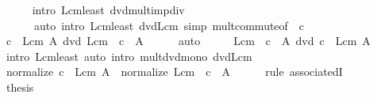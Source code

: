 \begin{isabellebody}
\ \ \ \ \isamarkupfalse%
\ {\isacharparenleft}{\kern0pt}intro\ Lcm{\isacharunderscore}{\kern0pt}least\ dvd{\isacharunderscore}{\kern0pt}mult{\isacharunderscore}{\kern0pt}imp{\isacharunderscore}{\kern0pt}div{\isacharparenright}{\kern0pt}\isanewline
\ \ \ \ \ \ {\isacharparenleft}{\kern0pt}auto\ intro{\isacharbang}{\kern0pt}{\isacharcolon}{\kern0pt}\ Lcm{\isacharunderscore}{\kern0pt}least\ dvd{\isacharunderscore}{\kern0pt}Lcm\ simp{\isacharcolon}{\kern0pt}\ mult{\isachardot}{\kern0pt}commute{\isacharbrackleft}{\kern0pt}of\ {\isacharunderscore}{\kern0pt}\ c{\isacharbrackright}{\kern0pt}{\isacharparenright}{\kern0pt}\isanewline
\ \ \isamarkupfalse%
\ \isamarkupfalse%
\ {\isachardoublequoteopen}c\ {\isacharasterisk}{\kern0pt}\ Lcm\ A\ dvd\ Lcm\ {\isacharparenleft}{\kern0pt}{\isacharparenleft}{\kern0pt}{\isacharasterisk}{\kern0pt}{\isacharparenright}{\kern0pt}\ c\ {\isacharbackquote}{\kern0pt}\ A{\isacharparenright}{\kern0pt}{\isachardoublequoteclose}\isanewline
\ \ \ \ \isamarkupfalse%
\ auto\isanewline
\ \ \isamarkupfalse%
\ \isamarkupfalse%
\ {\isachardoublequoteopen}Lcm\ {\isacharparenleft}{\kern0pt}{\isacharparenleft}{\kern0pt}{\isacharasterisk}{\kern0pt}{\isacharparenright}{\kern0pt}\ c\ {\isacharbackquote}{\kern0pt}\ A{\isacharparenright}{\kern0pt}\ dvd\ c\ {\isacharasterisk}{\kern0pt}\ Lcm\ A{\isachardoublequoteclose}\isanewline
\ \ \ \ \isamarkupfalse%
\ {\isacharparenleft}{\kern0pt}intro\ Lcm{\isacharunderscore}{\kern0pt}least{\isacharparenright}{\kern0pt}\ {\isacharparenleft}{\kern0pt}auto\ intro{\isacharcolon}{\kern0pt}\ mult{\isacharunderscore}{\kern0pt}dvd{\isacharunderscore}{\kern0pt}mono\ dvd{\isacharunderscore}{\kern0pt}Lcm{\isacharparenright}{\kern0pt}\isanewline
\ \ \isamarkupfalse%
\ \isamarkupfalse%
\ {\isachardoublequoteopen}normalize\ {\isacharparenleft}{\kern0pt}c\ {\isacharasterisk}{\kern0pt}\ Lcm\ A{\isacharparenright}{\kern0pt}\ {\isacharequal}{\kern0pt}\ normalize\ {\isacharparenleft}{\kern0pt}Lcm\ {\isacharparenleft}{\kern0pt}{\isacharparenleft}{\kern0pt}{\isacharasterisk}{\kern0pt}{\isacharparenright}{\kern0pt}\ c\ {\isacharbackquote}{\kern0pt}\ A{\isacharparenright}{\kern0pt}{\isacharparenright}{\kern0pt}{\isachardoublequoteclose}\isanewline
\ \ \ \ \isamarkupfalse%
\ {\isacharparenleft}{\kern0pt}rule\ associatedI{\isacharparenright}{\kern0pt}\isanewline
\ \ \isamarkupfalse%
\ \isamarkupfalse%
\ {\isacharquery}{\kern0pt}thesis\ \isamarkupfalse%

\end{isabellebody}
